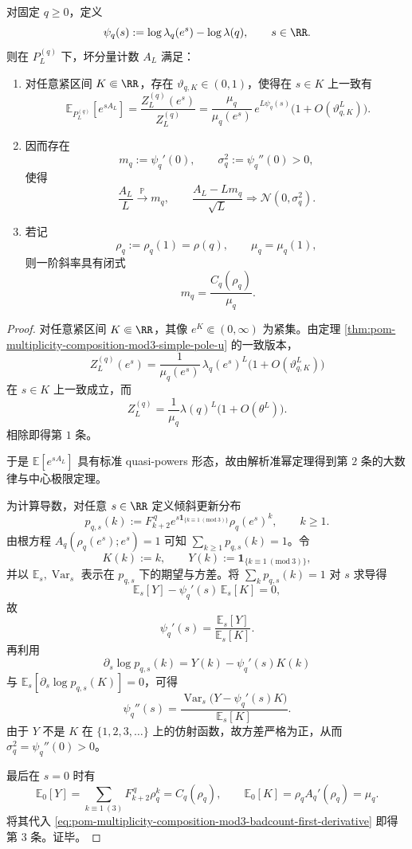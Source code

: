 \begin{theorem}\label{thm:pom-multiplicity-composition-mod3-badcount-clt}
对固定 \(q\ge 0\)，定义
\[
\psi_q(s):=\log\lambda_q(e^s)-\log\lambda(q),
\qquad s\in\RR.
\]
则在 \(P_L^{(q)}\) 下，坏分量计数 \(A_L\) 满足：
\begin{enumerate}
  \item 对任意紧区间 \(K\Subset\RR\)，存在 \(\vartheta_{q,K}\in(0,1)\)，使得在 \(s\in K\) 上一致有
  \[
  \boxed{\;
  \mathbb E_{P_L^{(q)}}[e^{sA_L}]
  =
  \frac{Z_L^{(q)}(e^s)}{Z_L^{(q)}}
  =
  \frac{\mu_q}{\mu_q(e^s)}\,e^{L\psi_q(s)}
  \bigl(1+O(\vartheta_{q,K}^L)\bigr).}
  \]
  \item 因而存在
  \[
  m_q:=\psi_q'(0),
  \qquad
  \sigma_q^2:=\psi_q''(0)>0,
  \]
  使得
  \[
  \frac{A_L}{L}\xrightarrow{\mathbb P} m_q,
  \qquad
  \frac{A_L-Lm_q}{\sqrt L}\Longrightarrow \mathcal N(0,\sigma_q^2).
  \]
  \item 若记
  \[
  \rho_q:=\rho_q(1)=\rho(q),
  \qquad
  \mu_q=\mu_q(1),
  \]
  则一阶斜率具有闭式
  \[
  \boxed{\;
  m_q=\frac{C_q(\rho_q)}{\mu_q}.}
  \]
\end{enumerate}
\end{theorem}
\begin{proof}
对任意紧区间 \(K\Subset\RR\)，其像 \(e^K\Subset(0,\infty)\) 为紧集。由定理 \ref{thm:pom-multiplicity-composition-mod3-simple-pole-u} 的一致版本，
\[
Z_L^{(q)}(e^s)
=
\frac{1}{\mu_q(e^s)}\,\lambda_q(e^s)^L
\bigl(1+O(\vartheta_{q,K}^L)\bigr)
\]
在 \(s\in K\) 上一致成立，而
\[
Z_L^{(q)}
=
\frac{1}{\mu_q}\lambda(q)^L\bigl(1+O(\theta^L)\bigr).
\]
相除即得第 \(1\) 条。

于是 \(\mathbb E[e^{sA_L}]\) 具有标准 quasi-powers 形态，故由解析准幂定理得到第 \(2\) 条的大数律与中心极限定理。

为计算导数，对任意 \(s\in\RR\) 定义倾斜更新分布
\[
p_{q,s}(k):=F_{k+2}^{\,q}e^{s\mathbf 1_{\{k\equiv 1\ (\mathrm{mod}\ 3)\}}}\rho_q(e^s)^k,
\qquad k\ge 1.
\]
由根方程 \(A_q(\rho_q(e^s);e^s)=1\) 可知 \(\sum_{k\ge 1}p_{q,s}(k)=1\)。令
\[
K(k):=k,
\qquad
Y(k):=\mathbf 1_{\{k\equiv 1\ (\mathrm{mod}\ 3)\}},
\]
并以 \(\mathbb E_s,\operatorname{Var}_s\) 表示在 \(p_{q,s}\) 下的期望与方差。将 \(\sum_k p_{q,s}(k)=1\) 对 \(s\) 求导得
\[
\mathbb E_s[Y]-\psi_q'(s)\,\mathbb E_s[K]=0,
\]
故
\begin{equation}\label{eq:pom-multiplicity-composition-mod3-badcount-first-derivative}
\psi_q'(s)=\frac{\mathbb E_s[Y]}{\mathbb E_s[K]}.
\end{equation}
再利用
\[
\partial_s\log p_{q,s}(k)=Y(k)-\psi_q'(s)K(k)
\]
与 \(\mathbb E_s[\partial_s\log p_{q,s}(K)]=0\)，可得
\[
\psi_q''(s)=\frac{\operatorname{Var}_s\!\bigl(Y-\psi_q'(s)K\bigr)}{\mathbb E_s[K]}.
\]
由于 \(Y\) 不是 \(K\) 在 \(\{1,2,3,\dots\}\) 上的仿射函数，故方差严格为正，从而 \(\sigma_q^2=\psi_q''(0)>0\)。

最后在 \(s=0\) 时有
\[
\mathbb E_0[Y]=\sum_{k\equiv 1\ (3)}F_{k+2}^{\,q}\rho_q^k=C_q(\rho_q),
\qquad
\mathbb E_0[K]=\rho_q A_q'(\rho_q)=\mu_q.
\]
将其代入 \eqref{eq:pom-multiplicity-composition-mod3-badcount-first-derivative} 即得第 \(3\) 条。证毕。
\end{proof}

